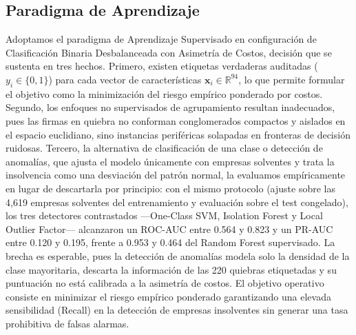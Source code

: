 \documentclass[journal]{IEEEtran}
\begin{document}
\subsection{Paradigma de Aprendizaje}
Adoptamos el paradigma de Aprendizaje Supervisado en configuración de Clasificación Binaria Desbalanceada con Asimetría de Costos, decisión que se sustenta en tres hechos. Primero, existen etiquetas verdaderas auditadas ($y_i \in \{0, 1\}$) para cada vector de características $\mathbf{x}_i \in \mathbb{R}^{94}$, lo que permite formular el objetivo como la minimización del riesgo empírico ponderado por costos. Segundo, los enfoques no supervisados de agrupamiento resultan inadecuados, pues las firmas en quiebra no conforman conglomerados compactos y aislados en el espacio euclidiano, sino instancias periféricas solapadas en fronteras de decisión ruidosas. Tercero, la alternativa de clasificación de una clase o detección de anomalías, que ajusta el modelo únicamente con empresas solventes y trata la insolvencia como una desviación del patrón normal, la evaluamos empíricamente en lugar de descartarla por principio: con el mismo protocolo (ajuste sobre las 4,619 empresas solventes del entrenamiento y evaluación sobre el test congelado), los tres detectores contrastados —One-Class SVM, Isolation Forest y Local Outlier Factor— alcanzaron un ROC-AUC entre 0.564 y 0.823 y un PR-AUC entre 0.120 y 0.195, frente a 0.953 y 0.464 del Random Forest supervisado. La brecha es esperable, pues la detección de anomalías modela solo la densidad de la clase mayoritaria, descarta la información de las 220 quiebras etiquetadas y su puntuación no está calibrada a la asimetría de costos. El objetivo operativo consiste en minimizar el riesgo empírico ponderado garantizando una elevada sensibilidad (Recall) en la detección de empresas insolventes sin generar una tasa prohibitiva de falsas alarmas.
\end{document}

